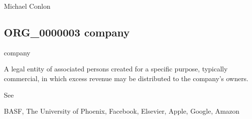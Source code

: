 \documentclass[letterpaper,10pt,english]{sphinxmanual}
\begin{document}
\begin{sphinxShadowBox}

\sphinxAtStartPar
Michael Conlon 
\end{sphinxShadowBox}
\begin{quote}

\ignorespaces \end{quote}


\subsection{ORG\_0000003 \sphinxhyphen{} company}
\label{\detokenize{doc-ORG_0000003:org-0000003-company}}\label{\detokenize{doc-ORG_0000003:index-0}}\label{\detokenize{doc-ORG_0000003::doc}}
\begin{sphinxShadowBox}

\sphinxAtStartPar
company
\end{sphinxShadowBox}

\begin{sphinxShadowBox}

\sphinxAtStartPar
{\hyperref[\detokenize{doc-ORG_0000001::doc}]{}}
\end{sphinxShadowBox}

\begin{sphinxShadowBox}

\sphinxAtStartPar
A legal entity of associated persons created for a specific purpose, typically commercial, in which excess revenue may be distributed to the company’s owners.
\end{sphinxShadowBox}

\begin{sphinxShadowBox}

\sphinxAtStartPar
See 
\end{sphinxShadowBox}

\begin{sphinxShadowBox}

\sphinxAtStartPar
BASF, The University of Phoenix, Facebook, Elsevier, Apple, Google, Amazon
\end{sphinxShadowBox}
\end{document}
